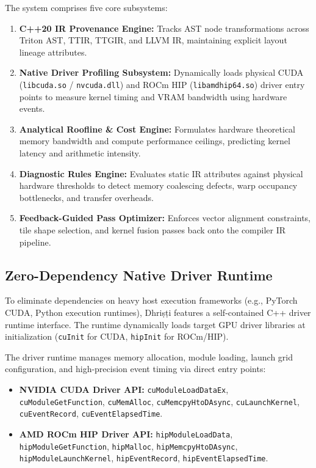 \documentclass[10pt,journal,compsoc]{IEEEtran}
\begin{document}
The system comprises five core subsystems:
\begin{enumerate}
    \item \textbf{C++20 IR Provenance Engine:} Tracks AST node transformations across Triton AST, TTIR, TTGIR, and LLVM IR, maintaining explicit layout lineage attributes.
    \item \textbf{Native Driver Profiling Subsystem:} Dynamically loads physical CUDA (\texttt{libcuda.so} / \texttt{nvcuda.dll}) and ROCm HIP (\texttt{libamdhip64.so}) driver entry points to measure kernel timing and VRAM bandwidth using hardware events.
    \item \textbf{Analytical Roofline \& Cost Engine:} Formulates hardware theoretical memory bandwidth and compute performance ceilings, predicting kernel latency and arithmetic intensity.
    \item \textbf{Diagnostic Rules Engine:} Evaluates static IR attributes against physical hardware thresholds to detect memory coalescing defects, warp occupancy bottlenecks, and transfer overheads.
    \item \textbf{Feedback-Guided Pass Optimizer:} Enforces vector alignment constraints, tile shape selection, and kernel fusion passes back onto the compiler IR pipeline.
\end{enumerate}

\subsection{Zero-Dependency Native Driver Runtime}
To eliminate dependencies on heavy host execution frameworks (e.g., PyTorch CUDA, Python execution runtimes), Dhri\d{s}\d{t}i features a self-contained C++ driver runtime interface. The runtime dynamically loads target GPU driver libraries at initialization (\texttt{cuInit} for CUDA, \texttt{hipInit} for ROCm/HIP).

The driver runtime manages memory allocation, module loading, launch grid configuration, and high-precision event timing via direct entry points:
\begin{itemize}
    \item \textbf{NVIDIA CUDA Driver API:} \texttt{cuModuleLoadDataEx}, \texttt{cuModuleGetFunction}, \texttt{cuMemAlloc}, \texttt{cuMemcpyHtoDAsync}, \texttt{cuLaunchKernel}, \texttt{cuEventRecord}, \texttt{cuEventElapsedTime}.
    \item \textbf{AMD ROCm HIP Driver API:} \texttt{hipModuleLoadData}, \texttt{hipModuleGetFunction}, \texttt{hipMalloc}, \texttt{hipMemcpyHtoDAsync}, \texttt{hipModuleLaunchKernel}, \texttt{hipEventRecord}, \texttt{hipEventElapsedTime}.
\end{itemize}
\end{document}

